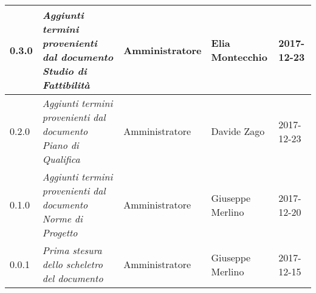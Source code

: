 \begin{table}[H]
\begin{tabular}{C{2cm}|C{4cm}|C{3cm}|C{3cm}|R{2cm}}
		0.3.0 & \emph{Aggiunti termini provenienti dal documento Studio di Fattibilità} & Amministratore & Elia Montecchio & 2017-12-23 \\
		\hline
		
		0.2.0 & \emph{Aggiunti termini provenienti dal documento Piano di Qualifica}  & Amministratore & Davide Zago & 2017-12-23 \\
		\hline
		
		0.1.0 & \emph{Aggiunti termini provenienti dal documento Norme di Progetto}  & Amministratore & Giuseppe Merlino & 2017-12-20 \\
		\hline
		
		0.0.1 & \emph{Prima stesura dello scheletro del documento} & Amministratore  & Giuseppe Merlino & 2017-12-15   \\
		
	\end{tabular}
	
\end{table}


\clearpage